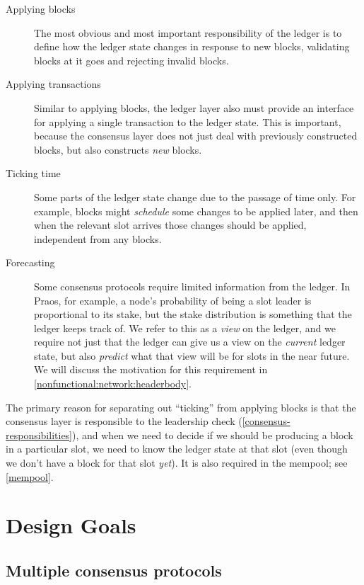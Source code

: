 \begin{description}
\item[Applying blocks] The most obvious and most important responsibility of
the ledger is to define how the ledger state changes in response to new blocks,
validating blocks at it goes and rejecting invalid blocks.\

\item[Applying transactions] Similar to applying blocks, the ledger layer also
must provide an interface for applying a single transaction to the ledger state.
This is important, because the consensus layer does not just deal with
previously constructed blocks, but also constructs \emph{new} blocks.

\item[Ticking time] Some parts of the ledger state change due to the passage of
time only. For example, blocks might \emph{schedule} some changes to be applied
later, and then when the relevant slot arrives those changes should be applied,
independent from any blocks.

\item[Forecasting] Some consensus protocols require limited information from the
ledger. In Praos, for example, a node's probability of being a slot leader is
proportional to its stake, but the stake distribution is something that the
ledger keeps track of. We refer to this as a \emph{view} on the ledger, and we
require not just that the ledger can give us a view on the \emph{current} ledger
state, but also \emph{predict} what that view will be for slots in the near
future. We will discuss the motivation for this requirement in
\cref{nonfunctional:network:headerbody}.
\end{description}

The primary reason for separating out ``ticking'' from applying blocks is that
the consensus layer is responsible to the leadership check
(\cref{consensus-responsibilities}), and when we need to decide if we should be
producing a block in a particular slot, we need to know the ledger state at that
slot (even though we don't have a block for that slot \emph{yet}). It is also
required in the mempool; see \cref{mempool}.

\section{Design Goals}

\subsection{Multiple consensus protocols}
\label{multiple-consensus-protocols}

